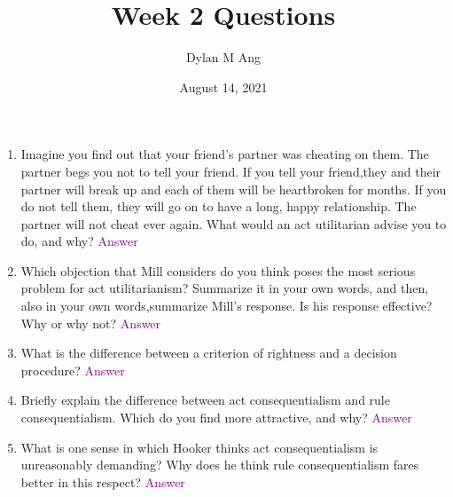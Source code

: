 \documentclass[12pt]{article}
\title{Week 2 Questions}
\author{Dylan M Ang}
\date{August 14, 2021}
\newcommand{\ans}[1]{\textcolor{purple}{#1}}
\begin{document}
\maketitle

\begin{enumerate}
    \item Imagine you find out that your friend’s partner was cheating on them. The partner begs you not to tell your friend. If you tell your friend,they and their partner will break up and each of them will be heartbroken for months. If you do not tell them, they will go on to have a long, happy relationship. The partner will not cheat ever again. What would an act utilitarian advise you to do, and why?
    \ans{Answer}

    \item Which objection that Mill considers do you think poses the most serious problem for act utilitarianism? Summarize it in your own words, and then, also in your own words,summarize Mill’s response. Is his response effective? Why or why not?
    \ans{Answer}

    \item What is the difference between a criterion of rightness and a decision procedure?
    \ans{Answer}

    \item Briefly explain the difference between act consequentialism and rule consequentialism. Which do you find more attractive, and why?
    \ans{Answer}

    \item What is one sense in which Hooker thinks act consequentialism is unreasonably demanding? Why does he think rule consequentialism fares better in this respect?
    \ans{Answer}
\end{enumerate}
\end{document}

